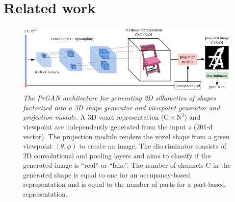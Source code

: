 \section{Related work}\label{s:related}

\begin{figure}[h]
\centering
\includegraphics[width=\linewidth]{prgan/fig/prgan-arch-fix.pdf}
\caption{\label{fig:prgan-arch} \emph{The PrGAN architecture for generating
  2D silhouettes of shapes factorized into a 3D shape generator and
  viewpoint generator and projection module.} A 3D voxel representation ($\text{C}
  \times \text{N}^3$) and
  viewpoint are independently generated from the input $z$ (201-d
  vector). The projection module renders the voxel shape from a given
  viewpoint $(\theta,\phi)$ to create an image. The discriminator
  consists of 2D convolutional and pooling layers and aims to classify
  if the generated image is ``real'' or ``fake''. The number of
  channels C in the generated shape is equal to one for an
  occupancy-based representation and is equal to the number of parts
  for a part-based representation.}
\end{figure}


